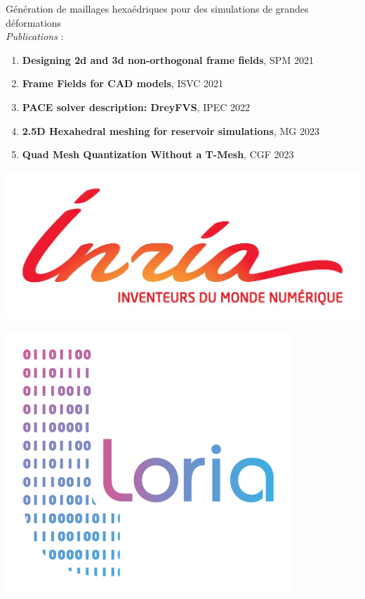 \documentclass{beamer}
\begin{document}
\begin{frame}
    \centering
    \vspace{0.5cm}
    { \Large{Génération de maillages hexaédriques pour des simulations de grandes déformations\\}}
    \vspace{1cm}
    \small
    \textit{Publications} :
    \begin{enumerate}
        \item \textbf{Designing 2d and 3d non-orthogonal frame fields}, SPM 2021
        \item \textbf{Frame Fields for CAD models}, ISVC 2021
        \item \textbf{PACE solver description: DreyFVS}, IPEC 2022
        \item \textbf{2.5D Hexahedral meshing for reservoir simulations}, MG 2023
        \item \textbf{Quad Mesh Quantization Without a T-Mesh}, CGF 2023
    \end{enumerate}
    \vspace{.3cm}
    \begin{minipage}{.195\textwidth}
        \centering
        \includegraphics[width=.8\linewidth]{img/new_images/inria.jpg}
    \end{minipage}%
    \begin{minipage}{.195\textwidth}
        \centering
        \includegraphics[width=.6\linewidth]{img/new_images/loria.png}

\end{minipage}
\end{frame}
\end{document}
